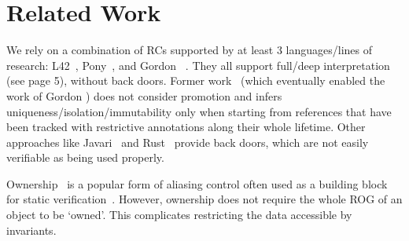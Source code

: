 \section[Related Work]{Related Work}
\label{s:related}
\vspace{-1ex}
We rely on a combination of RCs supported by at least 3 languages/lines of research:
L42~\cite{ServettoZucca15,ServettoEtAl13a,JOT:issue_2011_01/article1,GianniniEtAl16},
Pony~\cite{clebsch2015deny,clebsch2017orca}, and Gordon \etal~\cite{GordonEtAl12}.
They all support full/deep interpretation (see page 5), without back doors.
Former work~\cite{Boyland10,boyland2003checking,Hogg91,Smith:2000:AT:645394.651903,DBLP:conf/pldi/AikenFKT03} (which eventually enabled the work of Gordon \etal)  does not consider promotion and 
infers uniqueness/isolation/immutability only when starting from references that have been tracked with restrictive annotations along their whole lifetime.
Other approaches like Javari~\cite{TschantzErnst05,Boyland06}
and Rust~\cite{matsakis2014rust}
provide back doors, which are not easily verifiable as being used properly.

Ownership~\cite{ClarkeEtAl13,ZibinEtAl10,DietlEtAl07} is a popular form of aliasing control often used as a building block for static verification~\cite{%
muller2002modular,%
barnett2011specification%
}.  However, ownership does not require the whole ROG of an object to be `owned'. This complicates restricting the data accessible by invariants.

